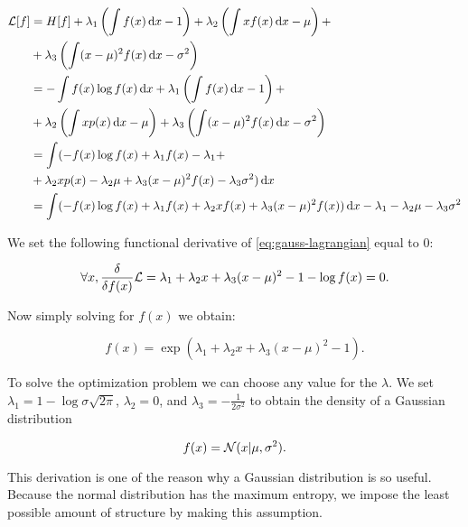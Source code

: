 \begin{align}
\gL[f] &= H[f] + \lambda_1 \left( \int f(x) \dx - 1 \right) + \lambda_2 \left( \int x f(x) \dx - \mu \right) + \\
 &+ \lambda_3 \left( \int (x - \mu)^2 f(x) \dx - \sigma^2 \right) \\
&= -\int f(x) \log f(x) \dx  + \lambda_1 \left( \int f(x) \dx - 1 \right) + \\
&+ \lambda_2 \left( \int x p(x) \dx - \mu \right) + \lambda_3 \left( \int (x - \mu)^2  f(x) \dx - \sigma^2 \right) \\
&= \int ( - f(x) \log f(x) + \lambda_1 f(x) - \lambda_1 + \\
&+ \lambda_2 x p(x) - \lambda_2 \mu + \lambda_3 (x - \mu)^2  f(x) - \lambda_3 \sigma^2 ) \dx \\
&= \int ( - f(x)\log f(x) + \lambda_1 f(x) + \lambda_2 x f(x) + \lambda_3 (x - \mu)^2  f(x) ) \dx - \lambda_1 - \lambda_2 \mu - \lambda_3 \sigma^2 \label{eq:gauss-lagrangian}
\end{align}

 We set the following functional derivative of \eqref{eq:gauss-lagrangian} equal to $0$:

\begin{equation}
\forall x, \frac{\delta}{\delta f(x)} {\mathcal{L}} = \lambda_1 + \lambda_2 x + \lambda_3 (x - \mu)^2 - 1 - \log f(x) = 0.
\end{equation}

Now simply solving for $f(x)$ we obtain:

\begin{equation}
f(x) = \exp \left( \lambda_1 + \lambda_2 x + \lambda_3 (x - \mu)^2 - 1 \right).
\end{equation}

To solve the optimization problem we can choose any value for the $\lambda$. We set $\lambda_1 = 1 - \log \sigma \sqrt{2 \pi}$, $\lambda_2 = 0$, and $\lambda_3 = - \frac{1}{2 \sigma^2}$ to obtain the density of a Gaussian distribution

\begin{equation}
f(x) = {\mathcal{N}}(x | \mu, \sigma^2).
\end{equation}

This derivation is one of the reason why a Gaussian distribution is so useful.  Because the normal distribution has the maximum entropy, we impose the least possible amount of structure by making this assumption.

